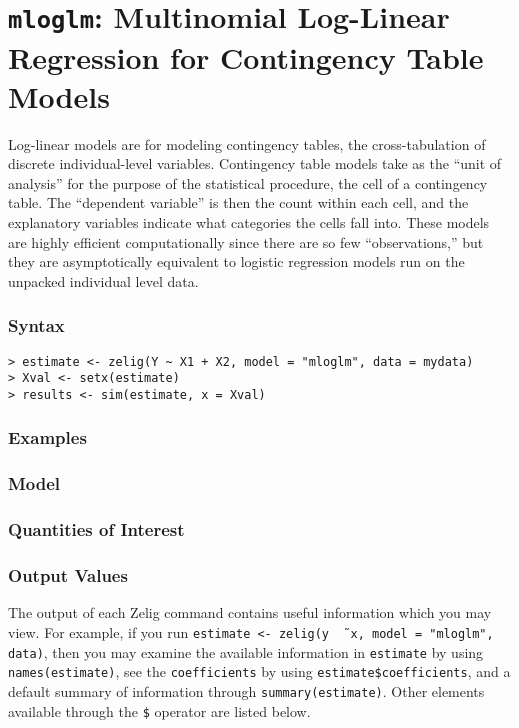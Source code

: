 \section{{\tt mloglm}: Multinomial Log-Linear Regression
for Contingency Table Models}\label{mloglm}

Log-linear models are for modeling contingency tables, the
cross-tabulation of discrete individual-level variables.  Contingency
table models take as the ``unit of analysis'' for the purpose of the
statistical procedure, the cell of a contingency table.  The
``dependent variable'' is then the count within each cell, and the
explanatory variables indicate what categories the cells fall into.
These models are highly efficient computationally since there are so
few ``observations,'' but they are asymptotically equivalent to
logistic regression models run on the unpacked individual level data.

\subsubsection{Syntax}

\begin{verbatim}
> estimate <- zelig(Y ~ X1 + X2, model = "mloglm", data = mydata)
> Xval <- setx(estimate)
> results <- sim(estimate, x = Xval)
\end{verbatim}

\subsubsection{Examples}

\subsubsection{Model}

\subsubsection{Quantities of Interest}

\subsubsection{Output Values}

The output of each Zelig command contains useful information which you
may view.  For example, if you run \texttt{estimate <- zelig(y \~\,
  x, model = "mloglm", data)}, then you may examine the available
information in \texttt{estimate} by using \texttt{names(estimate)},
see the {\tt coefficients} by using {\tt estimate\$coefficients}, and
a default summary of information through \texttt{summary(estimate)}.
Other elements available through the {\tt \$} operator are listed
below.

